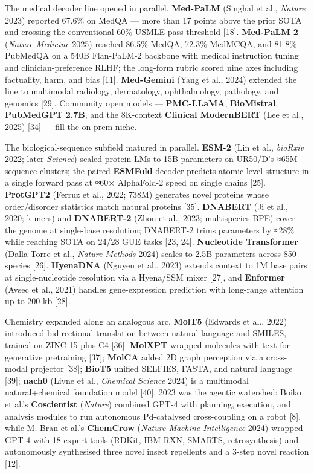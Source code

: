 The medical decoder line opened in parallel. \textbf{Med-PaLM} (Singhal et al., \emph{Nature} 2023) reported 67.6\% on MedQA --- more than 17 points above the prior SOTA and crossing the conventional 60\% USMLE-pass threshold {[}18{]}. \textbf{Med-PaLM 2} (\emph{Nature Medicine} 2025) reached 86.5\% MedQA, 72.3\% MedMCQA, and 81.8\% PubMedQA on a 540B Flan-PaLM-2 backbone with medical instruction tuning and clinician-preference RLHF; the long-form rubric scored nine axes including factuality, harm, and bias {[}11{]}. \textbf{Med-Gemini} (Yang et al., 2024) extended the line to multimodal radiology, dermatology, ophthalmology, pathology, and genomics {[}29{]}. Community open models --- \textbf{PMC-LLaMA}, \textbf{BioMistral}, \textbf{PubMedGPT 2.7B}, and the 8K-context \textbf{Clinical ModernBERT} (Lee et al., 2025) {[}34{]} --- fill the on-prem niche.

The biological-sequence subfield matured in parallel. \textbf{ESM-2} (Lin et al., \emph{bioRxiv} 2022; later \emph{Science}) scaled protein LMs to 15B parameters on UR50/D's ≈65M sequence clusters; the paired \textbf{ESMFold} decoder predicts atomic-level structure in a single forward pass at ≈60× AlphaFold-2 speed on single chains {[}25{]}. \textbf{ProtGPT2} (Ferruz et al., 2022; 738M) generates novel proteins whose order/disorder statistics match natural proteins {[}35{]}. \textbf{DNABERT} (Ji et al., 2020; k-mers) and \textbf{DNABERT-2} (Zhou et al., 2023; multispecies BPE) cover the genome at single-base resolution; DNABERT-2 trims parameters by ≈28\% while reaching SOTA on 24/28 GUE tasks {[}23, 24{]}. \textbf{Nucleotide Transformer} (Dalla-Torre et al., \emph{Nature Methods} 2024) scales to 2.5B parameters across 850 species {[}26{]}. \textbf{HyenaDNA} (Nguyen et al., 2023) extends context to 1M base pairs at single-nucleotide resolution via a Hyena/SSM mixer {[}27{]}, and \textbf{Enformer} (Avsec et al., 2021) handles gene-expression prediction with long-range attention up to 200 kb {[}28{]}.

Chemistry expanded along an analogous arc. \textbf{MolT5} (Edwards et al., 2022) introduced bidirectional translation between natural language and SMILES, trained on ZINC-15 plus C4 {[}36{]}. \textbf{MolXPT} wrapped molecules with text for generative pretraining {[}37{]}; \textbf{MolCA} added 2D graph perception via a cross-modal projector {[}38{]}; \textbf{BioT5} unified SELFIES, FASTA, and natural language {[}39{]}; \textbf{nach0} (Livne et al., \emph{Chemical Science} 2024) is a multimodal natural+chemical foundation model {[}40{]}. 2023 was the agentic watershed: Boiko et al.'s \textbf{Coscientist} (\emph{Nature}) combined GPT-4 with planning, execution, and analysis modules to run autonomous Pd-catalysed cross-coupling on a robot {[}8{]}, while M. Bran et al.'s \textbf{ChemCrow} (\emph{Nature Machine Intelligence} 2024) wrapped GPT-4 with 18 expert tools (RDKit, IBM RXN, SMARTS, retrosynthesis) and autonomously synthesised three novel insect repellents and a 3-step novel reaction {[}12{]}.

